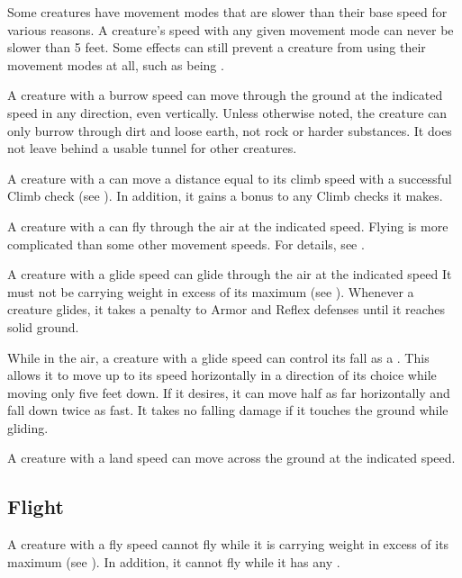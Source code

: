         Some creatures have movement modes that are slower than their base speed for various reasons.
        A creature's speed with any given movement mode can never be slower than 5 feet.
        Some effects can still prevent a creature from using their movement modes at all, such as being \immobilized.

        A creature with a burrow speed can move through the ground at the indicated speed in any direction, even vertically. Unless otherwise noted, the creature can only burrow through dirt and loose earth, not rock or harder substances. It does not leave behind a usable tunnel for other creatures.

        A creature with a  can move a distance equal to its climb speed with a successful Climb check (see ).
        In addition, it gains a  bonus to any Climb checks it makes.

        A creature with a  can fly through the air at the indicated speed.
        Flying is more complicated than some other movement speeds.
        For details, see .

        \label{Gliding}
        A creature with a glide speed can glide through the air at the indicated speed
        It must not be carrying weight in excess of its maximum  (see ).
        Whenever a creature glides, it takes a  penalty to Armor and Reflex defenses until it reaches solid ground.

        While in the air, a creature with a glide speed can control its fall as a . This allows it to move up to its speed horizontally in a direction of its choice while moving only five feet down. If it desires, it can move half as far horizontally and fall down twice as fast. It takes no falling damage if it touches the ground while gliding.

        A creature with a land speed can move across the ground at the indicated speed.

    \subsection{Flight}\label{Flight}
        A creature with a fly speed cannot fly while it is carrying weight in excess of its maximum  (see ).
        In addition, it cannot fly while it has any .

